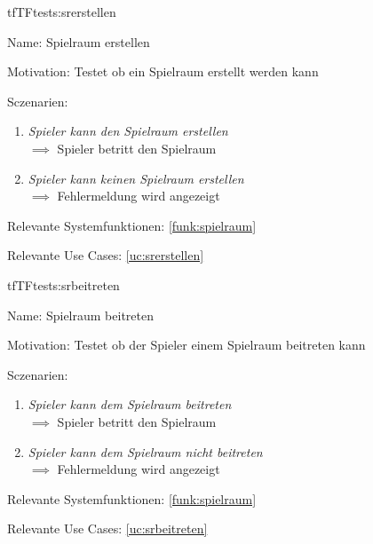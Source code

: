 \begin{description}[leftmargin=5em, style=sameline]

\begin{lhp}{tf}{TF}{tests:srerstellen}
	\item [Name:] Spielraum erstellen
	\item [Motivation:] Testet ob ein Spielraum erstellt werden kann
	\item [Sczenarien:] \hfill
		\begin{enumerate}
			\item \textit{ Spieler kann den Spielraum erstellen} \\ $\implies$ Spieler betritt den Spielraum
			\item \textit{ Spieler kann keinen Spielraum erstellen} \\ $\implies$ Fehlermeldung wird angezeigt
			
			
		\end{enumerate}
	\item [Relevante Systemfunktionen:] \ref{funk:spielraum}
	\item [Relevante Use Cases:] \ref{uc:srerstellen}
\end{lhp}

\end{description}








\begin{description}[leftmargin=5em, style=sameline]

\begin{lhp}{tf}{TF}{tests:srbeitreten}
	\item [Name:] Spielraum beitreten
	\item [Motivation:] Testet ob der Spieler einem Spielraum beitreten kann
	\item [Sczenarien:] \hfill
		\begin{enumerate}
			\item \textit{Spieler kann dem Spielraum beitreten } \\ $\implies$ Spieler betritt den Spielraum
			\item \textit{ Spieler kann dem Spielraum nicht beitreten} \\ $\implies$ Fehlermeldung wird angezeigt
			
			
		\end{enumerate}
	\item [Relevante Systemfunktionen:] \ref{funk:spielraum}
	\item [Relevante Use Cases:] \ref{uc:srbeitreten}
\end{lhp}

\end{description}








